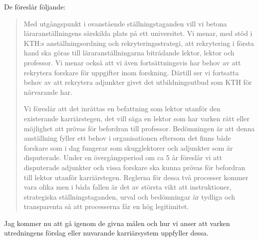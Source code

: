\documentclass[a4paper,oneside,article,swedish]{memoir}
\begin{document}
De föreslår följande:
\blockcquote[s.~2]{utredning}{%
  Med utgångspunkt i ovanstående ställningstaganden vill vi betona 
  läraranställningens
  särskilda plats på ett universitet. Vi menar, med stöd i KTH:s 
  anställningsordning och
  rekryteringsstrategi, att rekrytering i första hand ska göras till 
  läraranställningarna
  biträdande lektor, lektor och professor. Vi menar också att vi även 
  fortsättningsvis har behov
  av att rekrytera forskare för uppgifter inom forskning. Därtill ser vi 
  fortsatta behov av att
  rekrytera adjunkter givet det utbildningsutbud som KTH för närvarande har.

  Vi föreslår att det inrättas en befattning som lektor utanför den existerande 
  karriärstegen, det
  vill säga en lektor som har varken rätt eller möjlighet att prövas för 
  befordran till professor.
  Bedömningen är att denna anställning fyller ett behov i organisationen 
  eftersom det finns
  både forskare som i dag fungerar som skugglektorer och adjunkter som är 
  disputerade. Under
  en övergångsperiod om ca 5 år föreslår vi att disputerade adjunkter och vissa 
  forskare ska
  kunna prövas för befordran till lektor utanför karriärstegen. Reglerna för 
  dessa två processer
  kommer vara olika men i båda fallen är det av största vikt att instruktioner, 
  strategiska
  ställningstaganden, urval och bedömningar är tydliga och transparenta så att 
  processerna får
  en hög legitimitet.%
%
%
}
Jag kommer nu att gå igenom de givna målen och hur vi anser att varken 
utredningens förslag eller nuvarande karriärsystem uppfyller dessa.
\end{document}
